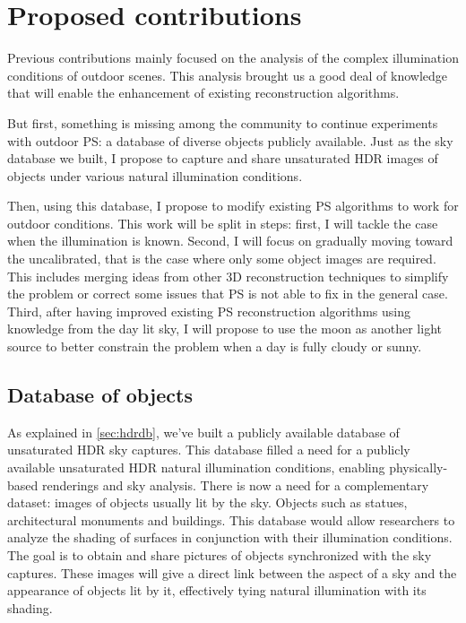 
\chapter{Proposed contributions}

Previous contributions mainly focused on the analysis of the complex illumination conditions of outdoor scenes. This analysis brought us a good deal of knowledge that will enable the enhancement of existing reconstruction algorithms.

But first, something is missing among the community to continue experiments with outdoor PS: a database of diverse objects publicly available. Just as the sky database we built, I propose to capture and share unsaturated HDR images of objects under various natural illumination conditions.

Then, using this database, I propose to modify existing PS algorithms to work for outdoor conditions. This work will be split in steps: first, I will tackle the case when the illumination is known. Second, I will focus on gradually moving toward the uncalibrated, that is the case where only some object images are required. This includes merging ideas from other 3D reconstruction techniques to simplify the problem or correct some issues that PS is not able to fix in the general case. Third, after having improved existing PS reconstruction algorithms using knowledge from the day lit sky, I will propose to use the moon as another light source to better constrain the problem when a day is fully cloudy or sunny.


\section{Database of objects}
\label{sec:dbobj}

As explained in \ref{sec:hdrdb}, we've built a publicly available database of unsaturated HDR sky captures. This database filled a need for a publicly available unsaturated HDR natural illumination conditions, enabling physically-based renderings and sky analysis. There is now a need for a complementary dataset: images of objects usually lit by the sky. Objects such as statues, architectural monuments and buildings. This database would allow researchers to analyze the shading of surfaces in conjunction with their illumination conditions. The goal is to obtain and share pictures of objects synchronized with the sky captures. These images will give a direct link between the aspect of a sky and the appearance of objects lit by it, effectively tying natural illumination with its shading.


